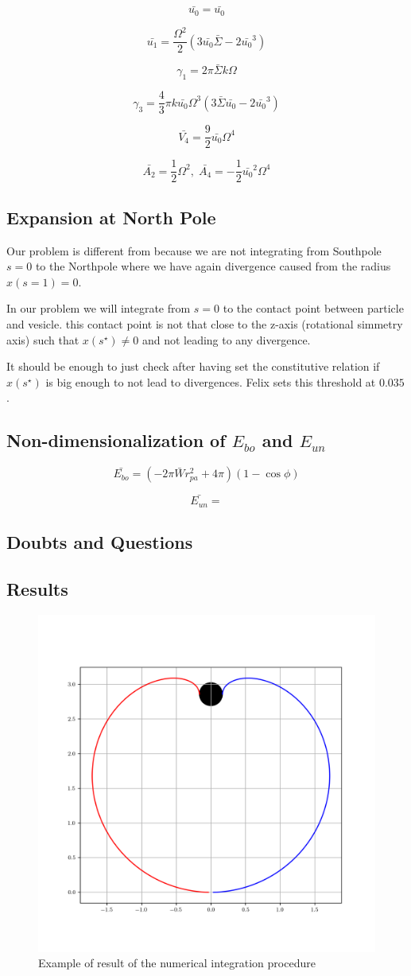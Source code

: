 \documentclass[12pt]{article}
\begin{document}
$$
\bar{u_0} = \bar{u_0} 
$$

$$
\bar{u_1} = \frac{\Omega^2}{2} (3\bar{u_0} \bar{\Sigma} - 2 \bar{u_0}^3) 
$$

$$
\gamma_1 = 2 \pi \bar{\Sigma} k \Omega 
$$

$$
\gamma_3 = \frac{4}{3} \pi k \bar{u_0} \Omega^3 (3 \bar{\Sigma} \bar{u_0} - 2 \bar{u_0}^3)
$$


$$
\bar{V_4} = \frac{9}{2}\bar{u_0} \Omega^4
$$

$$
\bar{A_2} = \frac{1}{2} \Omega^2 ,\; \bar{A_4} = -\frac{1}{2} \bar{u_0}^2 \Omega^4
$$

\subsection{Expansion at North Pole}
Our problem is different from \cite{freyMembraneAreaGain2022} because we are not integrating from Southpole $s=0$ to the Northpole where we have again divergence caused from the radius $x(s=1)=0$.

In our problem we will integrate from $s=0$ to the contact point between particle and vesicle. this contact point is not that close to the z-axis (rotational simmetry axis) such that $x(s^\star)\neq 0$ and not leading to any divergence.

It should be enough to just check after having set the constitutive relation if $x(s^\star)$ is big enough to not lead to divergences. Felix sets this threshold at $0.035$.


\subsection{Non-dimensionalization of $E_{bo}$ and $E_{un}$}
$$
\bar{E_{bo}} = (-2 \pi \bar{W} r_{pa}^2 + 4 \pi)(1-\cos \phi)
$$

$$
\bar{E_{un}} = 
$$

\subsection{Doubts and Questions}

\subsection{Results}
\begin{figure}
    \centering
    \includegraphics[width=0.5\linewidth]{code//plot/wrapped_rpa0.17_phi90.00.png}
    \caption{Example of result of the numerical integration procedure}
    \label{fig:enter-label}
\end{figure}
\end{document}
